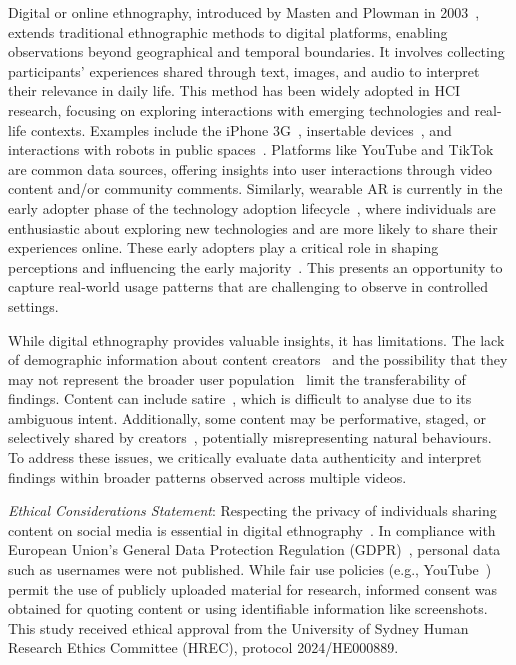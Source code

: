 Digital or online ethnography, introduced by Masten and Plowman in 2003~\cite{masten2003digital}, extends traditional ethnographic methods to digital platforms, enabling observations beyond geographical and temporal boundaries. It involves collecting participants' experiences shared through text, images, and audio to interpret their relevance in daily life. This method has been widely adopted in HCI research, focusing on exploring interactions with emerging technologies and real-life contexts. Examples include the iPhone 3G~\cite{blythe2009critical}, insertable devices~\cite{komkaite2019underneath}, and interactions with robots in public spaces~\cite{nielsen2023using, yu2024understanding}. Platforms like YouTube and TikTok are common data sources, offering insights into user interactions through video content and/or community comments. Similarly, wearable AR is currently in the early adopter phase of the technology adoption lifecycle~\cite{rogers2014diffusion}, where individuals are enthusiastic about exploring new technologies and are more likely to share their experiences online. These early adopters play a critical role in shaping perceptions and influencing the early majority~\cite{rogers2014diffusion}. This presents an opportunity to capture real-world usage patterns that are challenging to observe in controlled settings.

While digital ethnography provides valuable insights, it has limitations. The lack of demographic information about content creators~\cite{nielsen2023using} and the possibility that they may not represent the broader user population~\cite{blythe2009critical} limit the transferability of findings. Content can include satire~\cite{blythe2009critical}, which is difficult to analyse due to its ambiguous intent. Additionally, some content may be performative, staged, or selectively shared by creators~\cite{paay2015connecting}, potentially misrepresenting natural behaviours. To address these issues, we critically evaluate data authenticity and interpret findings within broader patterns observed across multiple videos.

\textit{Ethical Considerations Statement}: Respecting the privacy of individuals sharing content on social media is essential in digital ethnography~\cite{nielsen2023using}. In compliance with European Union’s General Data Protection Regulation (GDPR)~\cite{GDPR2018}, personal data such as usernames were not published. While fair use policies (e.g., YouTube~\cite{FairUse2021}) permit the use of publicly uploaded material for research, informed consent was obtained for quoting content or using identifiable information like screenshots. This study received ethical approval from the University of Sydney Human Research Ethics Committee (HREC), protocol 2024/HE000889.


